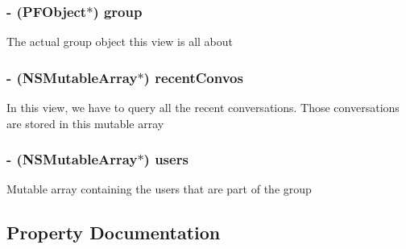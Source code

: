 \subsubsection[{group}]{\setlength{\rightskip}{0pt plus 5cm}-\/ ({\bf P\+F\+Object}$\ast$) group\hspace{0.3cm}{\ttfamily [protected]}}\label{category_e_s_group_settings_view_07_08_a8c86317189a4f9e6a04d40dbc94b3214}
The actual group object this view is all about \hypertarget{category_e_s_group_settings_view_07_08_abe8301cbf71e700bf3e60a4b0fb1f35e}{}
\subsubsection[{recent\+Convos}]{\setlength{\rightskip}{0pt plus 5cm}-\/ (N\+S\+Mutable\+Array$\ast$) recent\+Convos\hspace{0.3cm}{\ttfamily [protected]}}\label{category_e_s_group_settings_view_07_08_abe8301cbf71e700bf3e60a4b0fb1f35e}
In this view, we have to query all the recent conversations. Those conversations are stored in this mutable array \hypertarget{category_e_s_group_settings_view_07_08_a2e3d8db1741824b6ee4c18a379b855f1}{}
\subsubsection[{users}]{\setlength{\rightskip}{0pt plus 5cm}-\/ (N\+S\+Mutable\+Array$\ast$) users\hspace{0.3cm}{\ttfamily [protected]}}\label{category_e_s_group_settings_view_07_08_a2e3d8db1741824b6ee4c18a379b855f1}
Mutable array containing the users that are part of the group 

\subsection{Property Documentation}
\hypertarget{category_e_s_group_settings_view_07_08_a54aa2404914ccfdf262cf4f2c8c881c2}{}
